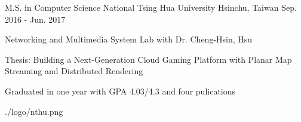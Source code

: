 

\begin{cventries}

  \cventry
    {M.S. in Computer Science} %
    {National Tsing Hua University} %
    {Hsinchu, Taiwan} %
    {Sep. 2016 - Jun. 2017} %
    {
      \begin{cvitems} %
        \item {Networking and Multimedia System Lab with Dr. Cheng-Hsin, Hsu}
        \item {Thesis: Building a Next-Generation Cloud Gaming Platform with Planar Map Streaming and Distributed Rendering}
        \item {Graduated in one year with GPA 4.03/4.3 and four pulications}
      \end{cvitems}
    }
    {./logo/nthu.png} %

\end{cventries}
